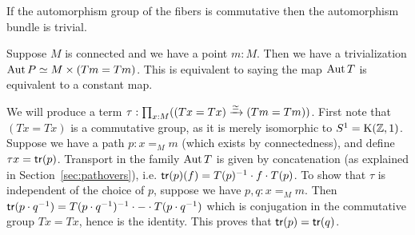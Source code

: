 If the automorphism group of the fibers is commutative then the automorphism bundle is trivial.

\begin{mylemma}
\label{lem:gauge_triv}
Suppose \( M \) is connected and we have a point \( m:M \). Then we have a trivialization \( \operatorname{Aut} P\simeq M\times (Tm=Tm) \). This is equivalent to saying the map \( \operatorname{Aut} T \) is equivalent to a constant map.
\end{mylemma}
\begin{myproof}
We will produce a term \( \tau:\prod_{x:M}((Tx=Tx)\xrightarrow[]{\simeq}(Tm=Tm)) \). First note that \( (Tx=Tx) \) is a commutative group, as it is merely isomorphic to \( S^1=\mathrm{K}(\mathbb{Z},1) \). Suppose we have a path \( p:x=_M m \) (which exists by connectedness), and define \( \tau x=\mathsf{tr}(p) \). Transport in the family \( \operatorname{Aut} T \) is given by concatenation (as explained in Section~\ref{sec:pathovers}), i.e. \( \mathsf{tr}(p)(f)=T(p)^{-1}\cdot f\cdot T(p) \). To show that \( \tau \) is independent of the choice of \( p \), suppose we have \( p,q:x=_M m \). Then \( \mathsf{tr}(p\cdot q^{-1})=T(p\cdot q^{-1})^{-1}\cdot -\cdot T(p\cdot q^{-1}) \) which is conjugation in the commutative group \( Tx=Tx \), hence is the identity. This proves that \( \mathsf{tr}(p)=\mathsf{tr}(q) \).
\end{myproof}
